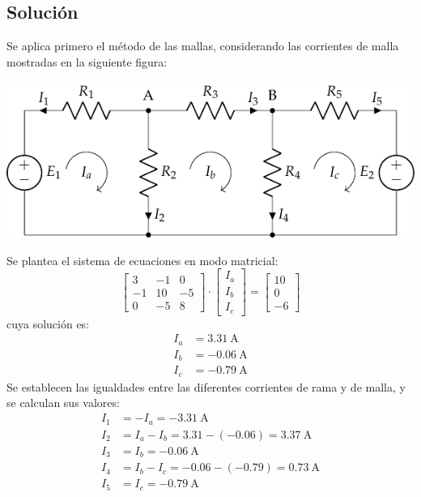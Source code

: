 \subsection*{Solución}
Se aplica primero el método de las mallas, considerando las corrientes
de malla mostradas en la siguiente figura:
\begin{center}
  \includegraphics{figuras/BT1_08_mallas.pdf}
\end{center}

Se plantea el sistema de ecuaciones en modo matricial:
\begin{equation*}
  \begin{bmatrix}
    3 & -1 & 0 \\
    -1 & 10 & -5 \\
    0 & -5 & 8
  \end{bmatrix} \cdot
  \begin{bmatrix}
    I_a\\
    I_b\\
    I_c
  \end{bmatrix} = %
  \begin{bmatrix}
    10 \\
    0\\
    -6
  \end{bmatrix}
\end{equation*}
cuya solución es:
\begin{align*}
  I_a&=\qty{3.31}{\ampere}\\
  I_b&=\qty{-0.06}{\ampere}\\
  I_c&= \qty{-0.79}{\ampere}
\end{align*}
Se establecen las igualdades entre las diferentes corrientes de rama y
de malla, y se calculan sus valores:
\begin{align*}
  I_1&=-I_a=\qty{-3.31}{\ampere}\\
  I_2&=I_a-I_b=3.31-(-0.06)=\qty{3.37}{\ampere}\\
  I_3&=I_b=\qty{-0.06}{\ampere}\\
  I_4&=I_b-I_c=-0.06-(-0.79)=\qty{0.73}{\ampere}\\
  I_5&=I_c=\qty{-0.79}{\ampere}
\end{align*}
	
